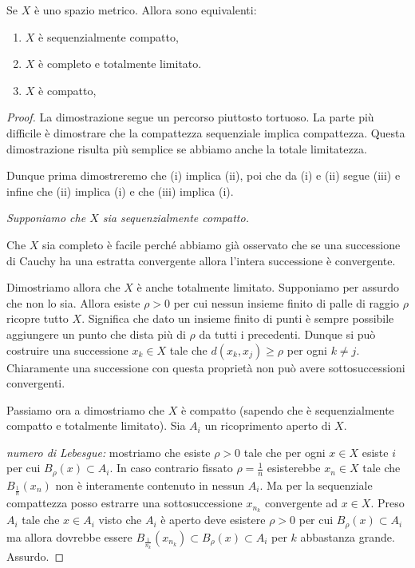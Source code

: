 \begin{theorem}
Se $X$ è uno spazio metrico.
Allora sono equivalenti:
\begin{enumerate} 
\item[(i)] $X$ è sequenzialmente compatto,
\item[(ii)] $X$ è completo e totalmente limitato.
\item[(iii)] $X$ è compatto, 
\end{enumerate}
\end{theorem}
\begin{proof}
La dimostrazione segue un percorso piuttosto tortuoso. 
La parte più difficile è dimostrare che la compattezza sequenziale 
implica compattezza. 
Questa dimostrazione risulta più semplice se abbiamo anche la totale limitatezza.

Dunque prima dimostreremo che (i) implica (ii), poi che da (i) e (ii) segue (iii)
e infine che (ii) implica (i) e che (iii) implica (i).

\emph{Supponiamo che $X$ sia sequenzialmente compatto.}

Che $X$ sia completo è facile perché abbiamo già osservato che se una successione
di Cauchy ha una estratta convergente allora l'intera successione è convergente.

Dimostriamo allora che $X$ è anche totalmente limitato.
Supponiamo per assurdo che non lo sia.
Allora esiste $\rho>0$ per cui nessun insieme finito 
di palle di raggio $\rho$ ricopre tutto $X$. 
Significa che dato un insieme finito di punti è sempre 
possibile aggiungere un punto che dista più di $\rho$ 
da tutti i precedenti. 
Dunque si può costruire una successione $x_k\in X$ 
tale che $d(x_k,x_j)\ge \rho$ per ogni $k\neq j$.
Chiaramente una successione con questa proprietà 
non può avere sottosuccessioni convergenti.

Passiamo ora a dimostriamo che $X$ è compatto (sapendo che è sequenzialmente 
compatto e totalmente limitato). 
Sia $A_i$ un ricoprimento aperto di $X$.

\emph{numero di Lebesgue:} 
mostriamo che esiste $\rho>0$ tale che per ogni $x\in X$ esiste 
$i$ per cui $B_\rho(x) \subset A_i$.
In caso contrario fissato $\rho=\frac 1 n$
esisterebbe $x_n \in X$ tale che $B_{\frac 1 n}(x_n)$ 
non è interamente contenuto in nessun $A_i$.
Ma per la sequenziale compattezza posso estrarre una 
sottosuccessione $x_{n_k}$ convergente ad $x\in X$.
Preso $A_i$ tale che $x\in A_i$ visto che $A_i$ 
è aperto deve esistere $\rho>0$ 
per cui $B_\rho(x)\subset A_i$
ma allora dovrebbe essere $B_{\frac 1 {n_k}}(x_{n_k})\subset 
B_\rho(x)\subset A_i$ per $k$ abbastanza grande. Assurdo.


\end{proof}
